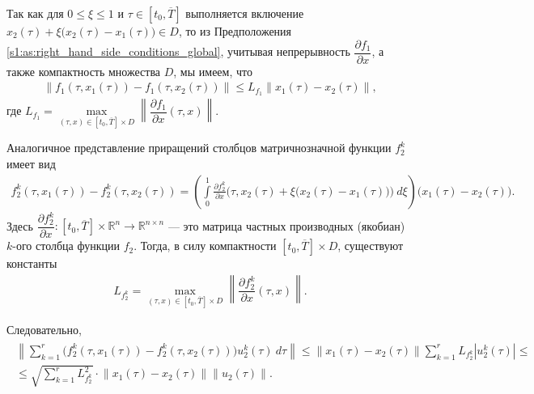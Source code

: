 \documentclass[../main.tex]{subfiles}
\begin{document}
Так как для $0 \leqslant \xi \leqslant 1 $ и $\tau \in [t_0,\overline{T}]$ выполняется включение $x_2(\tau) + \xi \big(x_2(\tau) - x_1(\tau)\big) \in D$, то из Предположения \ref{s1:as:right_hand_side_conditions_global}, учитывая непрерывность $\dfrac{\partial f_1}{\partial x} $, а также компактность множества $D$, мы имеем, что 
\begin{gather}\label{s1:lip_f1}
		\big\| f_1(\tau, x_1(\tau)) - f_1(\tau, x_2(\tau)) \big\| \leqslant L_{f_1} \|x_1(\tau) - x_2(\tau)\|,
\end{gather}
где $L_{f_1} = \max\limits_{(\tau, x ) \in [t_0, \overline{T}] \times D} \left\| \dfrac{\partial f_1}{\partial x} (\tau, x) \right\| $.

Аналогичное представление приращений столбцов матричнозначной функции $f_2^k$ имеет вид
\begin{gather}\label{s1:meanvalue_f2}
 f_2^k(\tau, x_1(\tau)) 
 - 
 f_2^k(\tau, x_2(\tau)) 
 = \left(
 \int\limits_0^1 
 \frac{\partial f_2^k}{\partial x} \Big(\tau, x_2(\tau) + \xi \big(x_2(\tau) - x_1(\tau)\big)\Big) 
 \ d\xi \right) 
 \big(x_1(\tau) - x_2(\tau)\big).
\end{gather}
Здесь $\dfrac{\partial f_2^k}{\partial x}: [t_0, \overline{T}] \times \mathbb{R}^n \rightarrow \mathbb{R}^{n \times n} $ --- это матрица частных производных (якобиан) $k$-ого столбца функции $f_2$. 
Тогда, в силу компактности $[t_0, \overline{T}] \times D$, существуют константы 
\begin{gather*}
	L_{f_2^k} = \max\limits_{(\tau, x ) \in [t_0, \overline{T}] \times D} \left\| \dfrac{\partial f_2^k}{\partial x} (\tau, x) \right\|.
\end{gather*}
 
Следовательно, 
\begin{gather}\label{s1:lip_f2}
	\begin{gathered}
	\left\|
	 \sum\limits_{k = 1}^{r}
	\Big( f_2^k(\tau, x_1(\tau)) - f_2^k(\tau, x_2(\tau)) \Big) u_2^k(\tau) \ d\tau 
	\right\| 
	\leqslant
	\left\|
	x_1(\tau) - x_2(\tau)
	\right\|
	 \sum\limits_{k = 1}^{r} 
	 L_{f_2^k}
	 \left|
	 u_2^k(\tau)
	 \right|
	 \leqslant \\ \leqslant 
	 \sqrt{\sum_{k=1}^r L_{f_2^k}^2} \cdot
	 \left\|
	 x_1(\tau) - x_2(\tau)
	 \right\| 
	 \| u_2(\tau) \|.
	 \end{gathered}
\end{gather}
 
\end{document}
